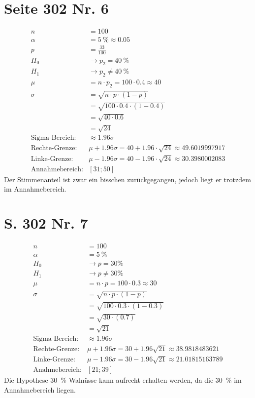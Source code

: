 \documentclass[12pt,a4paper]{report}
\begin{document}
	\section{Seite 302 Nr. 6}
	\begin{align*}
		n &= 100 \\
		\alpha &= 5\ \% \approx 0.05 \\
		p &= \frac{33}{100} \\
		H_0 &\to p_2 = 40\ \% \\
		H_1 &\to p_2 \ne 40\ \% \\
		\mu &= n \cdot p_2 = 100 \cdot 0.4 \approx 40 \\
		\sigma &= \sqrt{n\cdot p\cdot (1-p)} \\
		&=\sqrt{100\cdot 0.4 \cdot (1-0.4)} \\
		&=\sqrt{40 \cdot 0.6} \\
		&=\sqrt{24}\\
		\text{Sigma-Bereich}: & \approx 1.96\sigma \\
		\text{Rechte-Grenze}: & \mu + 1.96\sigma = 40 + 1.96 \cdot \sqrt{24}\approx 49.6019997917 \\
		\text{Linke-Grenze}: & \mu - 1.96\sigma = 40 - 1.96 \cdot \sqrt{24} \approx 30.3980002083 \\
		\text{Annahmebereich}: & [31;50]
	\end{align*}
	Der Stimmenanteil ist zwar ein bisschen zurückgegangen, jedoch liegt er trotzdem im Annahmebereich.
	\section{S. 302 Nr. 7}
	\begin{align*}
		n&=100 \\
		\alpha &= 5\ \% \\
		H_0&\to p=30\% \\
		H_1&\to p\ne30\%\\
		\mu&= n\cdot p = 100\cdot 0.3 \approx 30 \\
		\sigma &= \sqrt{n\cdot p\cdot (1-p)} \\
		&=\sqrt{100\cdot 0.3\cdot (1-0.3)} \\
		&=\sqrt{30\cdot (0.7)} \\
		&=\sqrt{21} \\
		\text{Sigma-Bereich}:& \approx 1.96\sigma \\
		\text{Rechte-Grenze}:& \mu + 1.96\sigma = 30 + 1.96\sqrt{21} \approx 38.9818483621 \\
		\text{Linke-Grenze}:& \mu - 1.96\sigma = 30 - 1.96\sqrt{21} \approx 21.01815163789 \\
		\text{Anahmebereich}: & [21;39]
	\end{align*}
	Die Hypothese 30\ \% Walnüsse kann aufrecht erhalten werden, da die 30\ \% im Annahmebereich liegen.
\end{document}

